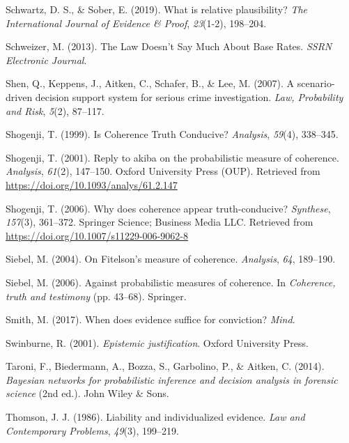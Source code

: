\documentclass[11pt,dvipsnames,enabledeprecatedfontcommands]{scrartcl}
\begin{document}
\leavevmode\hypertarget{ref-schwartz2019WhatRelativePlausibility}{}%
Schwartz, D. S., \& Sober, E. (2019). What is relative plausibility?
\emph{The International Journal of Evidence \& Proof}, \emph{23}(1-2),
198--204.

\leavevmode\hypertarget{ref-schweizer2013LawDoesnSay}{}%
Schweizer, M. (2013). The Law Doesn't Say Much About Base Rates.
\emph{SSRN Electronic Journal}.

\leavevmode\hypertarget{ref-shen2007ScenariodrivenDecisionSupporta}{}%
Shen, Q., Keppens, J., Aitken, C., Schafer, B., \& Lee, M. (2007). A
scenario-driven decision support system for serious crime investigation.
\emph{Law, Probability and Risk}, \emph{5}(2), 87--117.

\leavevmode\hypertarget{ref-shogenji1999}{}%
Shogenji, T. (1999). Is Coherence Truth Conducive? \emph{Analysis},
\emph{59}(4), 338--345.

\leavevmode\hypertarget{ref-Shogenji2001Reply}{}%
Shogenji, T. (2001). Reply to akiba on the probabilistic measure of
coherence. \emph{Analysis}, \emph{61}(2), 147--150. Oxford University
Press (OUP). Retrieved from
\url{https://doi.org/10.1093/analys/61.2.147}

\leavevmode\hypertarget{ref-Shogenji2006Why}{}%
Shogenji, T. (2006). Why does coherence appear truth-conducive?
\emph{Synthese}, \emph{157}(3), 361--372. Springer Science; Business
Media LLC. Retrieved from
\url{https://doi.org/10.1007/s11229-006-9062-8}

\leavevmode\hypertarget{ref-Siebel2004On-Fitelsons-me}{}%
Siebel, M. (2004). On Fitelson's measure of coherence. \emph{Analysis},
\emph{64}, 189--190.

\leavevmode\hypertarget{ref-siebel2006against}{}%
Siebel, M. (2006). Against probabilistic measures of coherence. In
\emph{Coherence, truth and testimony} (pp. 43--68). Springer.

\leavevmode\hypertarget{ref-Smith_conviction_mind_2017}{}%
Smith, M. (2017). When does evidence suffice for conviction?
\emph{Mind}.

\leavevmode\hypertarget{ref-Swinburne2001-SWIEJ}{}%
Swinburne, R. (2001). \emph{Epistemic justification}. Oxford University
Press.

\leavevmode\hypertarget{ref-taroni2006bayesian}{}%
Taroni, F., Biedermann, A., Bozza, S., Garbolino, P., \& Aitken, C.
(2014). \emph{Bayesian networks for probabilistic inference and decision
analysis in forensic science} (2nd ed.). John Wiley \& Sons.

\leavevmode\hypertarget{ref-Thomson86}{}%
Thomson, J. J. (1986). Liability and individualized evidence. \emph{Law
and Contemporary Problems}, \emph{49}(3), 199--219.
\end{document}
